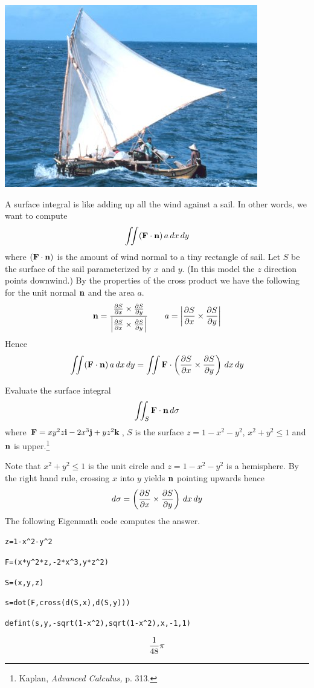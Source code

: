 
\newpage

\begin{center}
\noindent
\includegraphics[scale=0.5]{sailboat.png}
\end{center}

\bigskip
\noindent
A surface integral is like adding up all the wind against a sail.
In other words, we want to compute
$$\int\!\!\!\int({\bf F\cdot n})\,a\,dx\,dy$$
where $({\bf F\cdot n})$ is the amount of wind normal to a tiny rectangle
of sail.
Let $S$ be the surface of the sail parameterized by $x$ and $y$.
(In this model the $z$ direction points downwind.)
By the properties of the cross product we have the following for the unit normal $\bf n$
and the area $a$.
$${\bf n}={ {{\partial S\over\partial x}\times{\partial S\over\partial y}}\over
 {\left|{\partial S\over\partial x}\times{\partial S\over\partial y}\right|}}\qquad
a=\left|{\partial S\over\partial x}\times{\partial S\over\partial y}\right|$$
Hence
$$\int\!\!\!\int({\bf F\cdot n})\,a\,dx\,dy=\int\!\!\!\int{\bf F}\cdot
\left({{\partial S\over\partial x}\times{\partial S\over\partial y}}\right)\,dx\,dy$$

\newpage

\noindent
Evaluate the surface integral
$$\int\!\!\!\int_S{\bf F\cdot n}\,d\sigma$$
where ${\bf F}=xy^2z{\bf i}-2x^3{\bf j}+yz^2{\bf k}$, $S$ is the surface
$z=1-x^2-y^2$, $x^2+y^2\le1$ and $\bf n$ is upper.\footnote{
Kaplan, {\it Advanced Calculus,} p. 313.}

\medskip
\noindent
Note that $x^2+y^2\le1$ is the unit circle and $z=1-x^2-y^2$ is a hemisphere.
By the right hand rule, crossing $x$ into $y$ yields $\bf n$ pointing upwards hence
$$d\sigma=\left({{\partial S\over\partial x}\times{\partial S\over\partial y}}\right)\,dx\,dy$$
The following Eigenmath code computes the answer.

\medskip
\verb$z=1-x^2-y^2$

\verb$F=(x*y^2*z,-2*x^3,y*z^2)$

\verb$S=(x,y,z)$

\verb$s=dot(F,cross(d(S,x),d(S,y)))$

\verb$defint(s,y,-sqrt(1-x^2),sqrt(1-x^2),x,-1,1)$

$${1\over48}\pi$$

